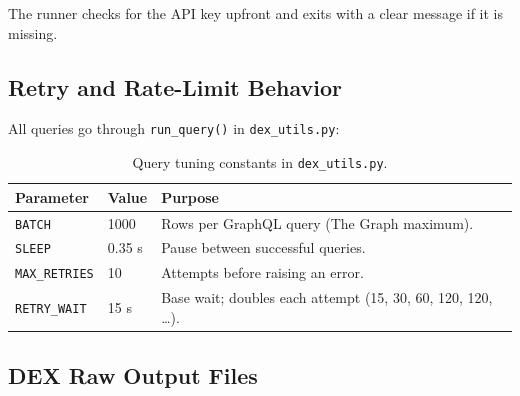 \documentclass[11pt,a4paper]{article}
\begin{document}
The runner checks for the API key upfront and exits with a clear message if it is missing.

\subsection{Retry and Rate-Limit Behavior}

All queries go through \texttt{run\_query()} in \texttt{dex\_utils.py}:

\begin{table}[H]
\centering
\small
\begin{tabular}{lll}
\toprule
\textbf{Parameter} & \textbf{Value} & \textbf{Purpose} \\
\midrule
\texttt{BATCH}       & 1000   & Rows per GraphQL query (The Graph maximum). \\
\texttt{SLEEP}       & 0.35 s & Pause between successful queries. \\
\texttt{MAX\_RETRIES} & 10    & Attempts before raising an error. \\
\texttt{RETRY\_WAIT} & 15 s  & Base wait; doubles each attempt (15, 30, 60, 120, 120, \ldots). \\
\bottomrule
\end{tabular}
\caption{Query tuning constants in \texttt{dex\_utils.py}.}
\end{table}

\subsection{DEX Raw Output Files}
\end{document}

